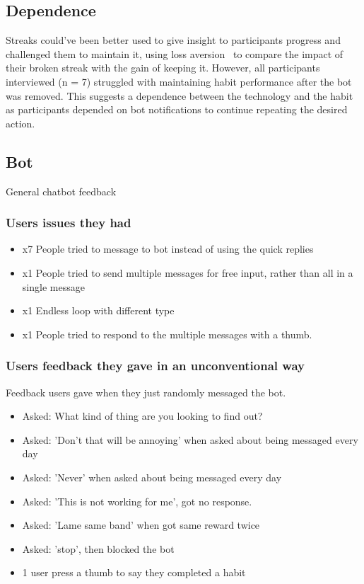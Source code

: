 \documentclass{scaffold/sigchi}
\begin{document}
\subsection{Dependence}
Streaks could've been better used to give insight to participants progress and challenged them to maintain it, using loss aversion~\cite{loss_aversion} to compare the impact of their broken streak with the gain of keeping it. However, all participants interviewed (n = 7) struggled with maintaining habit performance after the bot was removed. This suggests a dependence between the technology and the habit as participants depended on bot notifications to continue repeating the desired action.


\subsection{Bot}
General chatbot feedback


\subsubsection{Users issues they had}

\begin{itemize}
  \item x7 People tried to message to bot instead of using the quick replies
  \item x1 People tried to send multiple messages for free input, rather than all in a single message
  \item x1 Endless loop with different type
  \item x1 People tried to respond to the multiple messages with a thumb.
\end{itemize}


\subsubsection{Users feedback they gave in an unconventional way}
Feedback users gave when they just randomly messaged the bot.

\begin{itemize}
  \item Asked: What kind of thing are you looking to find out?
  \item Asked: 'Don't that will be annoying' when asked about being messaged every day
  \item Asked: 'Never' when asked about being messaged every day
  \item Asked: 'This is not working for me', got no response.
  \item Asked: 'Lame same band' when got same reward twice
  \item Asked: 'stop', then blocked the bot
  \item 1 user press a thumb to say they completed a habit
\end{itemize}
\end{document}

